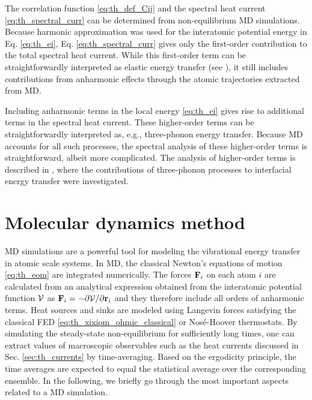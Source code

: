 The correlation function \eqref{eq:th_def_Cij} and the spectral heat current \eqref{eq:th_spectral_curr} can be determined from non-equilibrium MD simulations. Because harmonic approximation was used for the interatomic potential energy in Eq. \eqref{eq:th_ei}, Eq. \eqref{eq:th_spectral_curr} gives only the first-order contribution to the total spectral heat current. While this first-order term can be straightforwardly interpreted as elastic energy transfer (see ), it still includes contributions from anharmonic effects through the atomic trajectories extracted from MD.

Including anharmonic terms in the local energy \eqref{eq:th_ei} gives rise to additional terms in the spectral heat current. These higher-order terms can be straightforwardly interpreted as, e.g., three-phonon energy transfer. Because MD accounts for all such processes, the spectral analysis of these higher-order terms is straightforward, albeit more complicated. The analysis of higher-order terms is described in , where the contributions of three-phonon processes to interfacial energy transfer were investigated. 

\section{Molecular dynamics method}

\label{sec:methods_md}

MD simulations are a powerful tool for modeling the vibrational energy transfer in atomic scale systems. In MD, the classical Newton's equations of motion \eqref{eq:th_eom} are integrated numerically. The forces $\mathbf{F}_i$ on each atom $i$ are calculated from an analytical expression obtained from the interatomic potential function $\mathcal{V}$ as $\mathbf{F}_i=-\partial \mathcal{V}/\partial \mathbf{r}_i$ and they therefore include all orders of anharmonic terms. Heat sources and sinks are modeled using Langevin forces satisfying the classical FED \eqref{eq:th_xixiom_ohmic_classical} or Nos\'e-Hoover \cite{nose84,hoover85} thermostats. By simulating the steady-state non-equilibrium for sufficiently long times, one can extract values of macroscopic observables such as the heat currents discussed in Sec. \ref{sec:th_currents} by time-averaging. Based on the ergodicity principle, the time averages are expected to equal the statistical average over the corresponding ensemble. In the following, we briefly go through the most important aspects related to a MD simulation.

